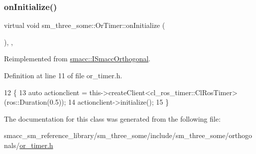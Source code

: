 \subsubsection{\texorpdfstring{on\+Initialize()}{onInitialize()}}
{\footnotesize\ttfamily virtual void sm\+\_\+three\+\_\+some\+::\+Or\+Timer\+::on\+Initialize (\begin{DoxyParamCaption}{ }\end{DoxyParamCaption})\hspace{0.3cm}{\ttfamily [inline]}, {\ttfamily [override]}, {\ttfamily [virtual]}}



Reimplemented from \hyperlink{classsmacc_1_1ISmaccOrthogonal_a6bb31c620cb64dd7b8417f8705c79c7a}{smacc\+::\+I\+Smacc\+Orthogonal}.



Definition at line 11 of file or\+\_\+timer.\+h.


\begin{DoxyCode}
12     \{
13         \textcolor{keyword}{auto} actionclient = this->createClient<cl\_ros\_timer::ClRosTimer>(ros::Duration(0.5));
14         actionclient->initialize();
15     \}
\end{DoxyCode}


The documentation for this class was generated from the following file\+:\begin{DoxyCompactItemize}
\item 
smacc\+\_\+sm\+\_\+reference\+\_\+library/sm\+\_\+three\+\_\+some/include/sm\+\_\+three\+\_\+some/orthogonals/\hyperlink{smacc__sm__reference__library_2sm__three__some_2include_2sm__three__some_2orthogonals_2or__timer_8h}{or\+\_\+timer.\+h}\end{DoxyCompactItemize}
